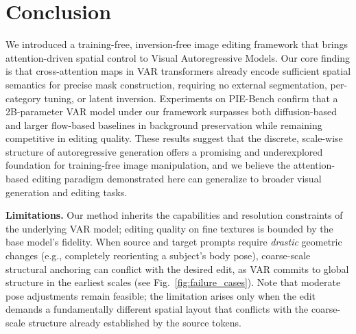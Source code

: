 \section{Conclusion}
\label{section:conclusion}

We introduced a training-free, inversion-free image editing framework that brings attention-driven spatial control to Visual Autoregressive Models. Our core finding is that cross-attention maps in VAR transformers already encode sufficient spatial semantics for precise mask construction, requiring no external segmentation, per-category tuning, or latent inversion. Experiments on PIE-Bench confirm that a 2B-parameter VAR model under our framework surpasses both diffusion-based and larger flow-based baselines in background preservation while remaining competitive in editing quality. These results suggest that the discrete, scale-wise structure of autoregressive generation offers a promising and underexplored foundation for training-free image manipulation, and we believe the attention-based editing paradigm demonstrated here can generalize to broader visual generation and editing tasks.

\noindent\textbf{Limitations.}
Our method inherits the capabilities and resolution constraints of the underlying VAR model; editing quality on fine textures is bounded by the base model's fidelity. When source and target prompts require \textit{drastic} geometric changes (e.g., completely reorienting a subject's body pose), coarse-scale structural anchoring can conflict with the desired edit, as VAR commits to global structure in the earliest scales (see Fig.~\ref{fig:failure_cases}). Note that moderate pose adjustments remain feasible; the limitation arises only when the edit demands a fundamentally different spatial layout that conflicts with the coarse-scale structure already established by the source tokens.

